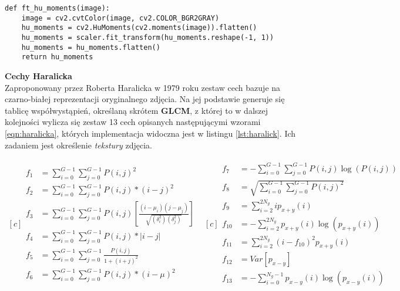 \begin{lstlisting}[caption={Implementacja ekstrakcji momentów hu}, label={lst:hu}]
def ft_hu_moments(image):
	image = cv2.cvtColor(image, cv2.COLOR_BGR2GRAY)
	hu_moments = cv2.HuMoments(cv2.moments(image)).flatten()
	hu_moments = scaler.fit_transform(hu_moments.reshape(-1, 1))
	hu_moments = hu_moments.flatten()
	return hu_moments
\end{lstlisting}

\textbf{Cechy Haralicka} \\

Zaproponowany przez Roberta Haralicka  w 1979 roku \cite{harlick} zestaw cech bazuje na czarno-białej reprezentacji oryginalnego zdjęcia. Na jej podstawie generuje się tablicę współwystąpień, określaną skrótem \textbf{GLCM}, z której to w dalszej kolejności wylicza się zestaw 13 cech opisanych następującymi wzorami \ref{eqn:haralicka}, których implementacja widoczna jest w listingu \ref{lst:haralick}. Ich zadaniem jest określenie \textit{tekstury} zdjęcia.

\begin{equation}
	\begin{aligned}[c]
		\begin{split}
			f_{1} &=\sum_{i=0}^{G-1}\sum_{j=0}^{G-1} P(i,j)^2 \\
			f_{2} &=\sum_{i=0}^{G-1}\sum_{j=0}^{G-1} P(i,j)*(i-j)^2 \\
			f_{3} &=\sum_{i=0}^{G-1}\sum_{j=0}^{G-1} P(i,j)\left [ \frac{(i-\mu_{i})(j-\mu_{j})}{\sqrt{(\delta^2_{i})(\delta^2_{j})}} \right ]\\
			f_{4} &=\sum_{i=0}^{G-1}\sum_{j=0}^{G-1} P(i,j)*\left | i-j \right | \\
			f_{5} & =\sum_{i=0}^{G-1}\sum_{j=0}^{G-1} \frac{P(i,j)}{1+(i+j)^2}\\
			f_{6} &=\sum_{i=0}^{G-1}\sum_{j=0}^{G-1} P(i,j)*(i-\mu)^2
			\end{split}
		\end{aligned}
		\begin{aligned}[c]
			\begin{split}
				f_{7} &=-\sum_{i=0}^{G-1}\sum_{j=0}^{G-1} P(i,j)\log(P(i,j))\\
				f_{8} &=\sqrt{\sum_{i=0}^{G-1}\sum_{j=0}^{G-1} P(i,j)^2 }\\
				f_{9} &=\sum_{i=2}^{2N_{g}}ip_{x+y}(i)\\
				f_{10} &=-\sum_{i=2}^{2N_{g}}p_{x+y}(i)\log(p_{x+y}(i))\\
				f_{11} &=\sum_{i=2}^{2N_{g}}(i - f_{10})^2 p_{x+y}(i)\\
				f_{12} &=Var\left [ p_{x-y} \right ]\\
				f_{13} &=-\sum_{i=0}^{N_{g}-1}p_{x-y}(i)\log(p_{x-y}(i))
			\end{split}
		\end{aligned}
	\label{eqn:haralicka}
\end{equation}

